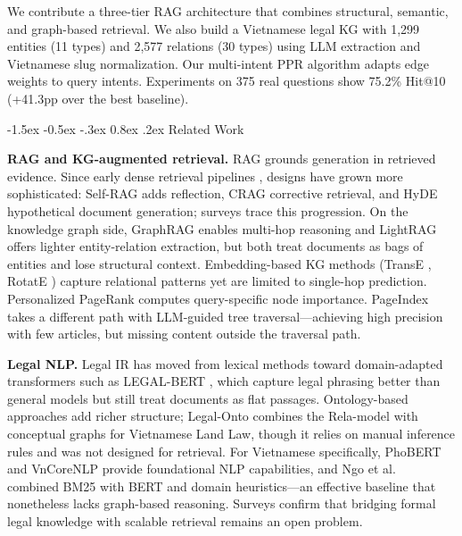 \documentclass{IOS-Book-Article}
\makeatletter
\renewcommand\section{\@startsection{section}{1}{\z@}%
  {-1.5ex \@plus -0.5ex \@minus -.3ex}%
  {0.8ex \@plus .2ex}%
  {\normalfont\large\bfseries}}
\makeatother
\begin{document}
We contribute a three-tier RAG architecture that combines structural, semantic, and graph-based retrieval. We also build a Vietnamese legal KG with 1,299 entities (11 types) and 2,577 relations (30 types) using LLM extraction and Vietnamese slug normalization. Our multi-intent PPR algorithm adapts edge weights to query intents. Experiments on 375 real questions show 75.2\% Hit@10 (+41.3pp over the best baseline).

\section{Related Work}
\label{sec:related}

\textbf{RAG and KG-augmented retrieval.}
RAG \cite{r1} grounds generation in retrieved evidence. Since early dense retrieval pipelines \cite{r10}, designs have grown more sophisticated: Self-RAG \cite{r11} adds reflection, CRAG \cite{r12} corrective retrieval, and HyDE \cite{r13} hypothetical document generation; surveys \cite{r3,r4} trace this progression. On the knowledge graph side, GraphRAG \cite{r6} enables multi-hop reasoning and LightRAG \cite{r5} offers lighter entity-relation extraction, but both treat documents as bags of entities and lose structural context. Embedding-based KG methods (TransE \cite{r14}, RotatE \cite{r15}) capture relational patterns yet are limited to single-hop prediction. Personalized PageRank \cite{r16,r17} computes query-specific node importance. PageIndex \cite{r7} takes a different path with LLM-guided tree traversal---achieving high precision with few articles, but missing content outside the traversal path.

\textbf{Legal NLP.}
Legal IR has moved from lexical methods \cite{r18,r19} toward domain-adapted transformers such as LEGAL-BERT \cite{r20}, which capture legal phrasing better than general models but still treat documents as flat passages. Ontology-based approaches \cite{r9} add richer structure; Legal-Onto \cite{r8} combines the Rela-model \cite{r21} with conceptual graphs for Vietnamese Land Law, though it relies on manual inference rules and was not designed for retrieval. For Vietnamese specifically, PhoBERT \cite{r22} and VnCoreNLP \cite{r23} provide foundational NLP capabilities, and Ngo et al.\ \cite{r24} combined BM25 with BERT \cite{r25} and domain heuristics---an effective baseline that nonetheless lacks graph-based reasoning. Surveys \cite{r26,r27} confirm that bridging formal legal knowledge with scalable retrieval remains an open problem.
\end{document}
